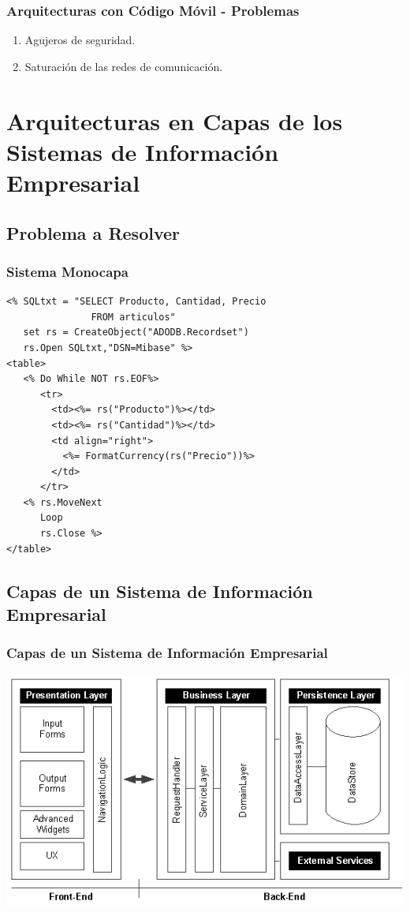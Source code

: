 \documentclass[a4paper,t,xcolor=pst,dvips,colortheme]{beamer}
\begin{document}
\begin{frame}[c]
    \frametitle{Arquitecturas con Código Móvil - Problemas}
    \begin{enumerate}[<+->]
        \item Agujeros de seguridad.
        \item Saturación de las redes de comunicación.
    \end{enumerate}
\end{frame}

\section[Arquitecturas en Capas de los SIE]{Arquitecturas en Capas de los Sistemas de Información Empresarial}

\subsection{Problema a Resolver}

\begin{frame}[c,fragile]
	\frametitle{Sistema Monocapa}
    \begin{lstlisting}[basicstyle=\small]
<% SQLtxt = "SELECT Producto, Cantidad, Precio
               FROM articulos"
   set rs = CreateObject("ADODB.Recordset")
   rs.Open SQLtxt,"DSN=Mibase" %>
<table>
   <% Do While NOT rs.EOF%>
      <tr>
        <td><%= rs("Producto")%></td>
        <td><%= rs("Cantidad")%></td>
        <td align="right">
          <%= FormatCurrency(rs("Precio"))%>
        </td>
      </tr>
   <% rs.MoveNext
      Loop
      rs.Close %>
</table>
    \end{lstlisting}
\end{frame}


\subsection[Capas de un SIE]{Capas de un Sistema de Información Empresarial}

\begin{frame}[c]
	\frametitle{Capas de un Sistema de Información Empresarial}
	\begin{center}
        \includegraphics[width=\linewidth,keepaspectratio=true]{images/enterpriseLayers/enterpriseLayers.eps}
	\end{center}
\end{frame}
\end{document}
